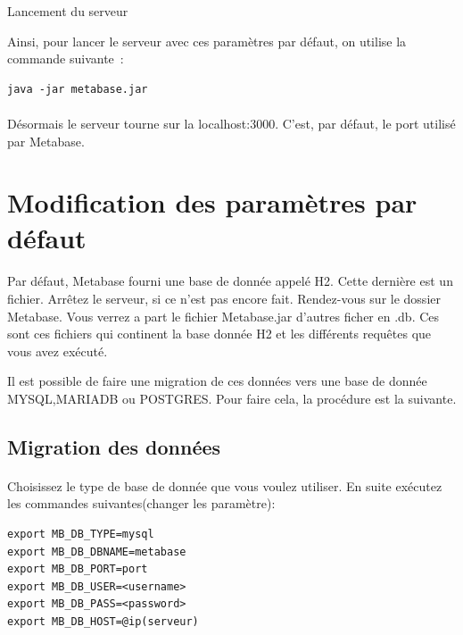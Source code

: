 \documentclass[a4paper,12pt]{report}
\begin{document}
Lancement du serveur 

Ainsi, pour lancer le serveur avec ces paramètres par défaut, on utilise la commande suivante :

\lstset{
language=SQL,
basicstyle=\footnotesize,
}
\begin{lstlisting}
java -jar metabase.jar
\end{lstlisting}


\paragraph*{}
Désormais le serveur tourne sur la localhost:3000. C’est, par défaut, le  port utilisé par Metabase.\newline  

\section{Modification des paramètres par défaut}

\paragraph*{} 

Par défaut, Metabase fourni une base de donnée appelé H2. Cette dernière est un fichier.\newline
Arrêtez le serveur, si ce n’est pas encore fait. Rendez-vous sur le dossier Metabase. Vous verrez a part le fichier Metabase.jar d’autres ficher en .db. Ces sont ces fichiers qui continent la base donnée H2 et les différents requêtes que vous avez exécuté.\newline 

Il est possible de faire une migration de ces données vers une base de donnée MYSQL,MARIADB ou POSTGRES. Pour faire cela, la procédure est la suivante.\newline 

\subsection{Migration des données}

\paragraph*{}
Choisissez le type de base de donnée que vous voulez utiliser. En suite exécutez les commandes suivantes(changer les paramètre):
\lstset{
language=SQL,
basicstyle=\footnotesize,
}
\begin{lstlisting}
export MB_DB_TYPE=mysql
export MB_DB_DBNAME=metabase
export MB_DB_PORT=port
export MB_DB_USER=<username>
export MB_DB_PASS=<password>
export MB_DB_HOST=@ip(serveur)
\end{lstlisting}
\end{document}
